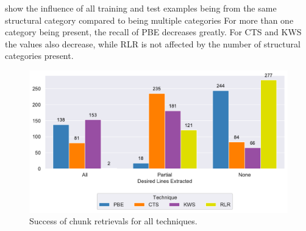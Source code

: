 show the influence of all training and test examples being from the
same structural category compared to being multiple categories
For more
than one category being present, the recall of PBE decreases greatly.
For CTS and KWS the values also decrease, while RLR is not affected by
the number of structural categories present.

\begin{figure}[!t]
		\centering
		\includegraphics[width=\columnwidth,
		clip]{img/big-study/success-partial-all.pdf}
		\caption{Success of chunk retrievals for all techniques.}
		\label{fig:success-partial-all}
\end{figure}


